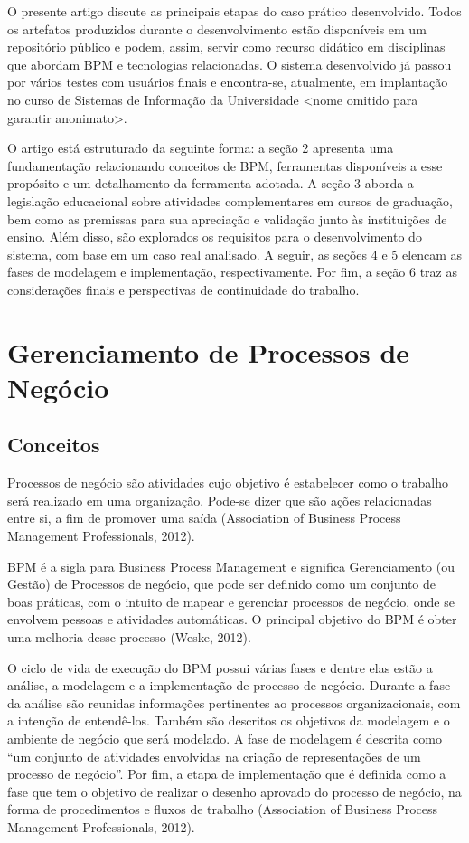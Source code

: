 \documentclass[12pt]{article}
\begin{document}
O presente artigo discute as principais etapas do caso prático desenvolvido. Todos os artefatos produzidos durante o desenvolvimento estão disponíveis em um repositório público e podem, assim, servir como recurso didático em disciplinas que abordam BPM e tecnologias relacionadas. O sistema desenvolvido já passou por vários testes com usuários finais e encontra-se, atualmente, em implantação no curso de Sistemas de Informação da Universidade <nome omitido para garantir anonimato>.

O artigo está estruturado da seguinte forma: a seção 2 apresenta uma fundamentação relacionando conceitos de BPM, ferramentas disponíveis a esse propósito e um detalhamento da ferramenta adotada. A seção 3 aborda a legislação educacional sobre atividades complementares em cursos de graduação, bem como as premissas para sua apreciação e validação junto às instituições de ensino. Além disso, são explorados os requisitos para o desenvolvimento do sistema, com base em um caso real analisado. A seguir, as seções 4 e 5 elencam as fases de modelagem e implementação, respectivamente. Por fim, a seção 6 traz as considerações finais e perspectivas de continuidade do trabalho.


\section{Gerenciamento de Processos de Negócio}

\subsection{Conceitos}

Processos de negócio são atividades cujo objetivo é estabelecer como o trabalho será realizado em uma organização. Pode-se dizer que são ações relacionadas entre si, a fim de promover uma saída (Association of Business Process Management Professionals, 2012).

	 BPM é a sigla para Business Process Management e significa Gerenciamento (ou Gestão) de Processos de negócio, que pode ser definido como um conjunto de boas práticas, com o intuito de mapear e gerenciar processos de negócio, onde se envolvem pessoas e atividades automáticas. O principal objetivo do BPM é obter uma melhoria desse processo (Weske, 2012).

	O ciclo de vida de execução do BPM possui várias fases e dentre elas estão a análise, a modelagem e a implementação de processo de negócio. Durante a fase da análise são reunidas informações pertinentes ao processos organizacionais, com a intenção de entendê-los. Também são descritos os objetivos da modelagem e o ambiente de negócio que será modelado. A fase de modelagem é descrita como “um conjunto de atividades envolvidas na criação de representações de um processo de negócio”. Por fim, a etapa de implementação que é definida como a fase que tem o objetivo de realizar o desenho aprovado do processo de negócio, na forma de procedimentos e fluxos de trabalho (Association of Business Process Management Professionals, 2012).
\end{document}
